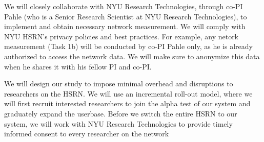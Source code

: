 We will closely collaborate with NYU Research Technologies, through co-PI Pahle (who is a Senior Research Scientist at NYU Research Technologies), to implement and obtain necessary network measurement. We will comply with NYU HSRN's privacy policies and best practices. For example, any netork measurement (Task 1b) will be conducted by co-PI Pahle only, as he is already authorized to access the network data. We will make sure to anonymize this data when he shares it with his fellow PI and co-PI.

We will design our study to impose minimal overhead and disruptions to researchers on the HSRN. We will use an incremental roll-out model, where we will first recruit interested researchers to join the alpha test of our system and graduately expand the userbase. Before we switch the entire HSRN to our system, we will work with NYU Research Technologies to provide timely informed consent to every researcher on the network



